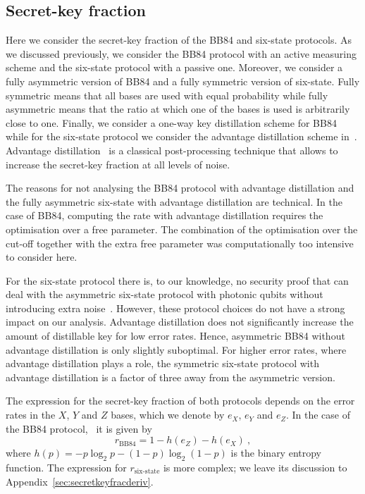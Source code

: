 \documentclass[aps,pra,reprint,superscriptaddress]{revtex4-1}
\begin{document}
\subsection*{Secret-key fraction}
Here we consider the secret-key fraction of the BB84 and six-state protocols. As we discussed previously, we consider the BB84 protocol with an active measuring scheme and the six-state protocol with a passive one. 
Moreover, we consider a fully asymmetric version of BB84 and a fully symmetric version of six-state. Fully symmetric means that all bases are used with equal probability while fully asymmetric means that the ratio at which one of the bases is used is arbitrarily close to one. Finally, we consider a one-way key distillation scheme for BB84~\cite{scarani2009security} while for the six-state protocol we consider the advantage distillation scheme in~\cite{watanabe2007key}. Advantage distillation~\cite{gottesman2003proof} is a classical post-processing technique that allows to increase the secret-key fraction at all levels of noise.

The reasons for not analysing the BB84 protocol with advantage distillation and the fully asymmetric six-state with advantage distillation are technical. In the case of BB84, computing the rate with advantage distillation requires the optimisation over a free parameter. The combination of the optimisation over the cut-off together with the extra free parameter was computationally too intensive to consider here.

For the six-state protocol there is, to our knowledge, no security proof that can deal with the asymmetric six-state protocol with photonic qubits without introducing extra noise~\cite{gittsovich2014squashing, ballester2008state}. However, these protocol choices do not have a strong impact on our analysis. Advantage distillation does not significantly increase the amount of distillable key for low error rates. Hence, asymmetric BB84 without advantage distillation is only slightly suboptimal. For higher error rates, where advantage distillation plays a role, the symmetric six-state protocol with advantage distillation is a factor of three away from the asymmetric version.   


The expression for the secret-key fraction of both protocols depends on the error rates in the $X$, $Y$ and $Z$ bases, which we denote by $e_X$, $e_Y$ and $e_Z$. In the case of the BB84 protocol,~\cite{scarani2009security, lo2005efficient} it is given by
\begin{equation}
r_{\text{BB84}} = 1 - h(e_Z) - h(e_{X})\ ,\label{eq:bb84skf}
\end{equation} 
where $h(p) = - p\log_2 p - (1-p) \log_2 (1-p)$ is the binary entropy function. The expression for $r_{\text{six-state}}$ is more complex; we leave its discussion to Appendix~\ref{sec:secretkeyfracderiv}. 
\end{document}
